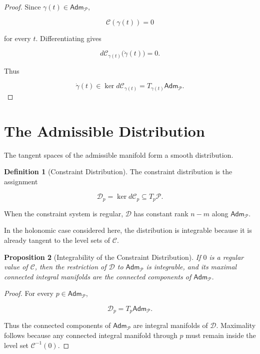 \documentclass[11pt,oneside]{book}
\numberwithin{equation}{chapter}
\theoremstyle{definition}
\newtheorem{definition}{Definition}[chapter]
\theoremstyle{plain}
\newtheorem{proposition}[definition]{Proposition}
\newcommand{\Adm}{\mathsf{Adm}}
\begin{document}
\begin{proof}

Since \(\gamma(t)\in\Adm_{\mathcal P}\),

\[
\mathcal C(\gamma(t))=0
\]

for every \(t\). Differentiating gives

\[
d\mathcal C_{\gamma(t)}
\bigl(
\dot\gamma(t)
\bigr)
=
0.
\]

Thus

\[
\dot\gamma(t)
\in
\ker d\mathcal C_{\gamma(t)}
=
T_{\gamma(t)}\Adm_{\mathcal P}.
\]

\end{proof}

\section{The Admissible Distribution}

The tangent spaces of the admissible manifold form a smooth distribution.

\begin{definition}[Constraint Distribution]

The constraint distribution is the assignment

\[
\mathscr D_p
=
\ker d\mathcal C_p
\subseteq
T_p\mathcal P.
\]

When the constraint system is regular, \(\mathscr D\) has constant rank
\(n-m\) along \(\Adm_{\mathcal P}\).

\end{definition}

In the holonomic case considered here, the distribution is integrable
because it is already tangent to the level sets of \(\mathcal C\).

\begin{proposition}[Integrability of the Constraint Distribution]

If \(0\) is a regular value of \(\mathcal C\), then the restriction of
\(\mathscr D\) to \(\Adm_{\mathcal P}\) is integrable, and its maximal
connected integral manifolds are the connected components of
\(\Adm_{\mathcal P}\).

\end{proposition}

\begin{proof}

For every \(p\in\Adm_{\mathcal P}\),

\[
\mathscr D_p
=
T_p\Adm_{\mathcal P}.
\]

Thus the connected components of \(\Adm_{\mathcal P}\) are integral
manifolds of \(\mathscr D\). Maximality follows because any connected
integral manifold through \(p\) must remain inside the level set
\(\mathcal C^{-1}(0)\).

\end{proof}
\end{document}
